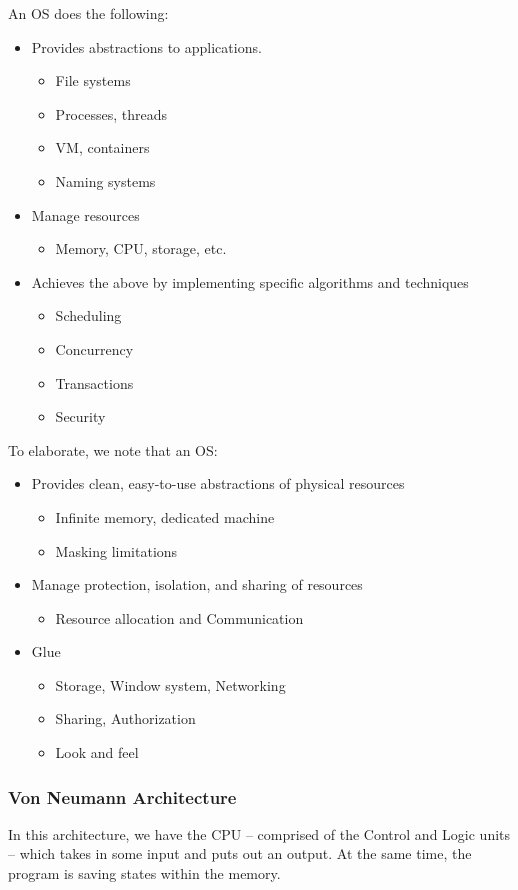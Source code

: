 \documentclass[openany]{book}
\begin{document}
An OS does the following:
\begin{itemize}
	\item Provides abstractions to applications.
	\begin{itemize}
		\item File systems
		\item Processes, threads
		\item VM, containers
		\item Naming systems
	\end{itemize}
	\item Manage resources
	\begin{itemize}
		\item Memory, CPU, storage, etc.
	\end{itemize}
	\item Achieves the above by implementing specific algorithms and techniques
	\begin{itemize}
		\item Scheduling
		\item Concurrency
		\item Transactions
		\item Security
	\end{itemize}
\end{itemize}

To elaborate, we note that an OS:
\begin{itemize}
	\item Provides clean, easy-to-use abstractions of physical resources
	\begin{itemize}
		\item Infinite memory, dedicated machine
		\item Masking limitations
	\end{itemize}
	\item Manage protection, isolation, and sharing of resources
	\begin{itemize}
		\item Resource allocation and Communication
	\end{itemize}
	\item Glue
	\begin{itemize}
		\item Storage, Window system, Networking
		\item Sharing, Authorization
		\item Look and feel
	\end{itemize}
\end{itemize}
\subsubsection{Von Neumann Architecture}
In this architecture, we have the CPU -- comprised of the Control and Logic units -- which takes in some input and puts out an output. At the same time, the program is saving states within the memory.
\end{document}

